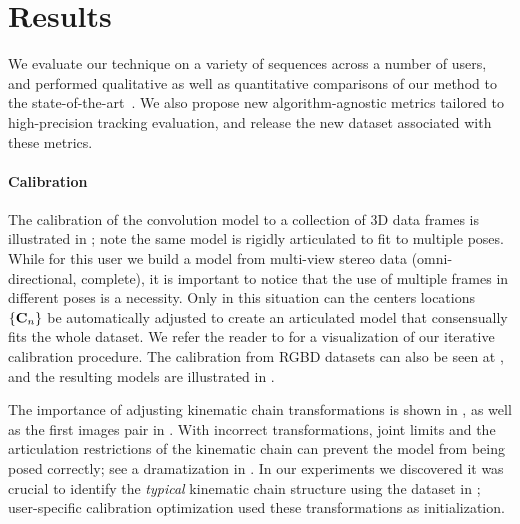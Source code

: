 \section{Results}
\label{sec:results}
We evaluate our technique on a variety of sequences across a number of users, 
and performed qualitative as well as quantitative  
comparisons of our method to the state-of-the-art~\cite{qian2014realtime,sridhar2015fast,tagliasacchi2015robust,sharp2015accurate,taylor2016concerto}. We also propose new algorithm-agnostic metrics tailored to high-precision tracking evaluation, and release the new \handy{} dataset associated with these metrics.

\paragraph{Calibration}
The calibration of the convolution model to a collection of 3D data frames is illustrated in ; note the same model is rigidly articulated to fit to multiple poses. While for this user we build a model from multi-view stereo data (omni-directional, complete), it is important to notice that the use of multiple frames in different poses is a necessity. Only in this situation can the centers locations ${\{\mathbf{C}_n\}}$ be automatically adjusted to create an articulated model that consensually fits the whole dataset. We refer the reader to \VideoMVS{} for a visualization of our iterative calibration procedure. The calibration from RGBD datasets can also be seen at \VideoCalibRGB{}, and the resulting models are illustrated in . 

The importance of adjusting kinematic chain transformations is shown in , as well as the first images pair in . With incorrect  transformations, joint limits and the articulation restrictions of the kinematic chain can prevent the model from being posed correctly; see a dramatization in \VideoKinematic{}. In our experiments we discovered it was crucial to identify the \emph{typical} kinematic chain structure using the dataset in ; user-specific calibration optimization used these transformations as initialization.


